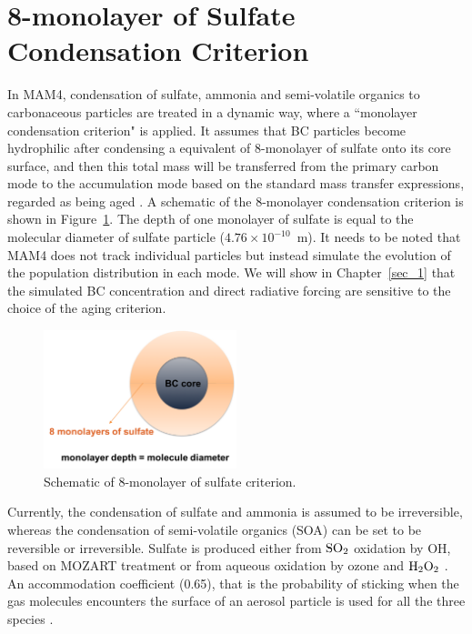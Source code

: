 \documentclass[12pt, fullpage]{uiucthesis2009}
\begin{document}
	
	\section{8-monolayer of Sulfate Condensation Criterion}\label{sec_2}
		
	In MAM4, condensation of sulfate, ammonia and semi-volatile organics to carbonaceous particles are treated in a dynamic way, where a ``monolayer condensation criterion" is applied. It assumes that BC particles become hydrophilic after condensing a equivalent of 8-monolayer of sulfate onto its core surface, and then this total mass will be transferred from the primary carbon mode to the accumulation mode based on the standard mass transfer expressions, regarded as being aged \citep{Liu2012}. A schematic of the 8-monolayer condensation criterion is shown in Figure~\ref{fig_P3}. The depth of one monolayer of sulfate is equal to the molecular diameter of sulfate particle ($4.76\times 10^{-10}$~m). It needs to be noted that MAM4 does not track individual particles but instead simulate the evolution of the population distribution in each mode. We will show in Chapter~\ref{sec_1} that the simulated BC concentration and direct radiative forcing are sensitive to the choice of the aging criterion.
	\begin{figure}[h] 
		\begin{center}
			\includegraphics[width = 0.5\textwidth]{Figure03}
			\caption[Schematic of 8-monolayer of sulfate criterion]{\label{fig_P3} Schematic of 8-monolayer of sulfate criterion.}
		\end{center}
	\end{figure}
	
	Currently, the condensation of sulfate and ammonia is assumed to be irreversible, whereas the condensation of semi-volatile organics (SOA) can be set to be reversible or irreversible. Sulfate is produced either from $\rm{SO}_{2}$ oxidation by OH, based on MOZART treatment or from aqueous oxidation by ozone and $\rm H_{2}O_{2}$ \citep{tie2001effects}. An accommodation coefficient (0.65), that is the probability of sticking when the gas molecules encounters the surface of an aerosol particle is used for all the three species \citep{Liu2012}. 
	
\end{document}
